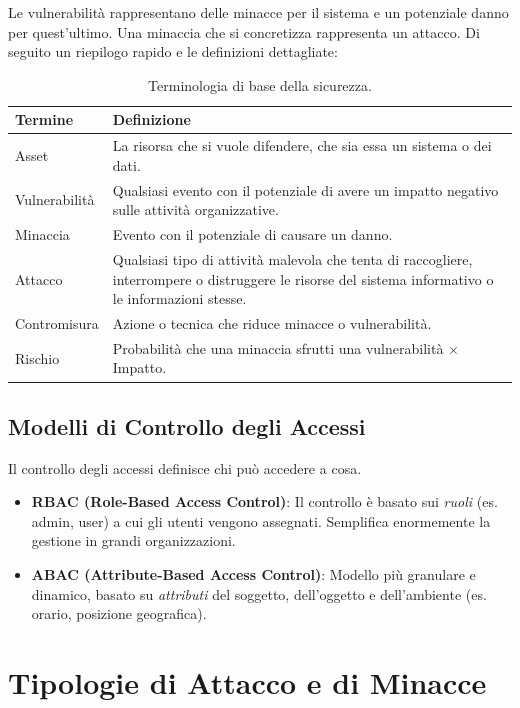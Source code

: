 Le vulnerabilità rappresentano delle minacce per il sistema e un potenziale danno per quest'ultimo. Una minaccia che si concretizza rappresenta un attacco. Di seguito un riepilogo rapido e le definizioni dettagliate:

\begin{table}[h!]
\centering
\begin{tabular}{|l|p{8cm}|}
\hline
\textbf{Termine} & \textbf{Definizione} \\ \hline
Asset & La risorsa che si vuole difendere, che sia essa un sistema o dei dati. \\ \hline
Vulnerabilità & Qualsiasi evento con il potenziale di avere un impatto negativo sulle attività organizzative. \\ \hline
Minaccia & Evento con il potenziale di causare un danno. \\ \hline
Attacco & Qualsiasi tipo di attività malevola che tenta di raccogliere, interrompere o distruggere le risorse del sistema informativo o le informazioni stesse. \\ \hline
Contromisura & Azione o tecnica che riduce minacce o vulnerabilità. \\ \hline
Rischio & Probabilità che una minaccia sfrutti una vulnerabilità $\times$ Impatto. \\ \hline
\end{tabular}
\caption{Terminologia di base della sicurezza.}
\end{table}

\subsection{Modelli di Controllo degli Accessi}
Il controllo degli accessi definisce chi può accedere a cosa.
\begin{itemize}
    \item \textbf{RBAC (Role-Based Access Control)}: Il controllo è basato sui \textit{ruoli} (es. admin, user) a cui gli utenti vengono assegnati. Semplifica enormemente la gestione in grandi organizzazioni.
    \item \textbf{ABAC (Attribute-Based Access Control)}: Modello più granulare e dinamico, basato su \textit{attributi} del soggetto, dell'oggetto e dell'ambiente (es. orario, posizione geografica).
\end{itemize}

\section{Tipologie di Attacco e di Minacce}


